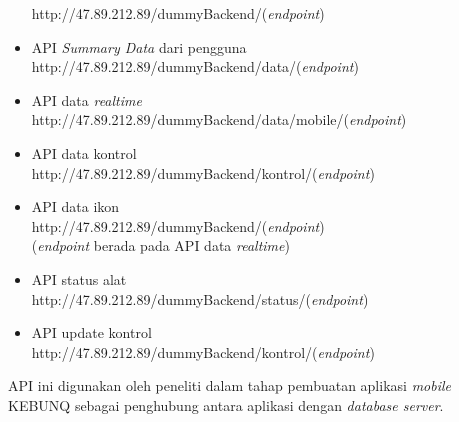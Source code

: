 \begin{flushleft}
\begin{justify}
\begin{itemize}
                http://47.89.212.89/dummyBackend/(\emph{endpoint})
                \item API \emph{Summary Data} dari pengguna\\
                http://47.89.212.89/dummyBackend/data/(\emph{endpoint})
                \item API data \emph{realtime}\\
                http://47.89.212.89/dummyBackend/data/mobile/(\emph{endpoint})
                \item API data kontrol\\
                http://47.89.212.89/dummyBackend/kontrol/(\emph{endpoint})
                \item API data ikon\\
                http://47.89.212.89/dummyBackend/(\emph{endpoint}) \\
                (\emph{endpoint} berada pada API data \emph{realtime})
                \item API status alat\\
                http://47.89.212.89/dummyBackend/status/(\emph{endpoint})
                \item API update kontrol\\
                http://47.89.212.89/dummyBackend/kontrol/(\emph{endpoint})
            \end{itemize}
        API ini digunakan oleh peneliti dalam tahap pembuatan aplikasi \emph{mobile} KEBUNQ sebagai penghubung antara aplikasi dengan \emph{database server}.\\
        

        


\end{justify}
\end{flushleft}
